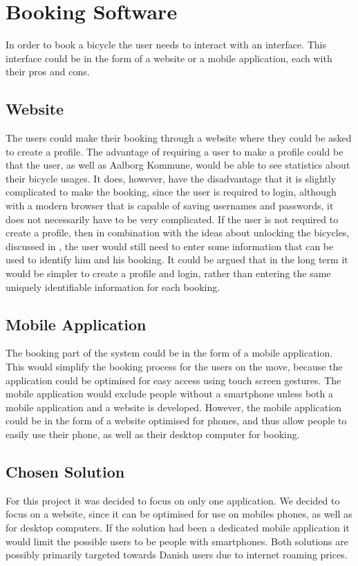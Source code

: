 \section{Booking Software}
In order to book a bicycle the user needs to interact with an interface.
This interface could be in the form of a website or a mobile application, each with their pros and cons.

\subsection{Website}
The users could make their booking through a website where they could be asked to create a profile.
The advantage of requiring a user to make a profile could be that the user, as well as Aalborg Kommune, would be able to see statistics about their bicycle usages.
It does, however, have the disadvantage that it is slightly complicated to make the booking, since the user is required to login, although with a modern browser that is capable of saving usernames and passwords, it does not necessarily have to be very complicated.
If the user is not required to create a profile, then in combination with the ideas about unlocking the bicycles, discussed in , the user would still need to enter some information that can be used to identify him and his booking.
It could be argued that in the long term it would be simpler to create a profile and login, rather than entering the same uniquely identifiable information for each booking.

\subsection{Mobile Application}
The booking part of the system could be in the form of a mobile application. 
This would simplify the booking process for the users on the move, because the application could be optimised for easy access using touch screen gestures.
The mobile application would exclude people without a smartphone unless both a mobile application and a website is developed.
However, the mobile application could be in the form of a website optimised for phones, and thus allow people to easily use their phone, as well as their desktop computer for booking. 

\subsection{Chosen Solution}
For this project it was decided to focus on only one application.
We decided to focus on a website, since it can be optimised for use on mobiles phones, as well as for desktop computers. 
If the solution had been a dedicated mobile application it would limit the possible users to be people with smartphones.
Both solutions are possibly primarily targeted towards Danish users due to internet roaming prices.

